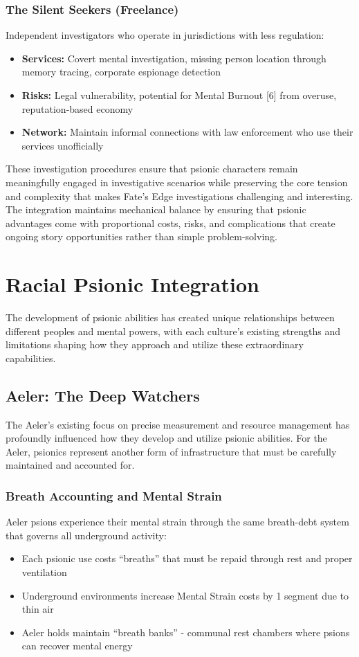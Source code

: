 \documentclass[11pt,twoside]{article}
\begin{document}
\subsubsection{The Silent Seekers (Freelance)}
Independent investigators who operate in jurisdictions with less regulation:
\begin{itemize}
    \item \textbf{Services:} Covert mental investigation, missing person location through memory tracing, corporate espionage detection
    \item \textbf{Risks:} Legal vulnerability, potential for Mental Burnout [6] from overuse, reputation-based economy
    \item \textbf{Network:} Maintain informal connections with law enforcement who use their services unofficially
\end{itemize}

These investigation procedures ensure that psionic characters remain meaningfully engaged in investigative scenarios while preserving the core tension and complexity that makes Fate's Edge investigations challenging and interesting. The integration maintains mechanical balance by ensuring that psionic advantages come with proportional costs, risks, and complications that create ongoing story opportunities rather than simple problem-solving.

\section{Racial Psionic Integration}

The development of psionic abilities has created unique relationships between different peoples and mental powers, with each culture's existing strengths and limitations shaping how they approach and utilize these extraordinary capabilities.

\subsection{Aeler: The Deep Watchers}

The Aeler's existing focus on precise measurement and resource management has profoundly influenced how they develop and utilize psionic abilities. For the Aeler, psionics represent another form of infrastructure that must be carefully maintained and accounted for.

\subsubsection{Breath Accounting and Mental Strain}
Aeler psions experience their mental strain through the same breath-debt system that governs all underground activity:
\begin{itemize}
    \item Each psionic use costs ``breaths'' that must be repaid through rest and proper ventilation
    \item Underground environments increase Mental Strain costs by 1 segment due to thin air
    \item Aeler holds maintain ``breath banks'' - communal rest chambers where psions can recover mental energy
\end{itemize}
\end{document}
